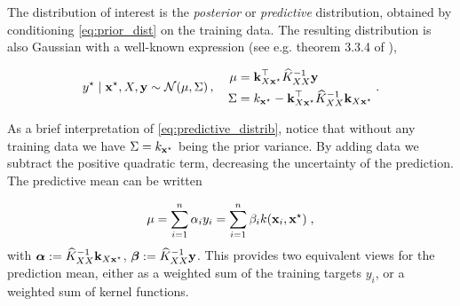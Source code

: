 \documentclass{article}
\begin{document}
The distribution of interest is the \emph{posterior} or \emph{predictive} distribution, obtained by conditioning \eqref{eq:prior_dist} on the training data. The resulting distribution is also Gaussian with a well-known expression (see e.g. theorem 3.3.4 of \cite{tong_multivariate_1990}),

\begin{equation} \label{eq:predictive_distrib}
    y^\star \mid \boldsymbol{\mathbf{x}}^\star, X, \boldsymbol{\mathbf{y}} \sim \mathcal N(\mu, \Sigma) \, , \quad 
    \begin{aligned}
        \mu &= \boldsymbol{\mathbf{k}}_{X \boldsymbol{\mathbf{x}}^\star}^\top \widehat K_{XX}^{-1} \boldsymbol{\mathbf{y}} \\
        \Sigma &= k_{\boldsymbol{\mathbf{x}}^\star} - \boldsymbol{\mathbf{k}}_{X \boldsymbol{\mathbf{x}}^\star}^\top \widehat K_{XX}^{-1} \boldsymbol{\mathbf{k}}_{X \boldsymbol{\mathbf{x}}^\star}
    \end{aligned} \; .
\end{equation}

As a brief interpretation of \eqref{eq:predictive_distrib}, notice that without any training data we have $\Sigma = k_{\boldsymbol{\mathbf{x}}^\star}$ being the prior variance. By adding data we subtract the positive quadratic term, decreasing the uncertainty of the prediction. %
The predictive mean can be written

\begin{equation*}
    \mu = \sum_{i=1}^n \alpha_i y_i = \sum_{i=1}^n \beta_i k(\boldsymbol{\mathbf{x}}_i, \boldsymbol{\mathbf{x}}^\star) \;,
\end{equation*}
%
with $\boldsymbol{\mathbf{\alpha}} := \widehat K_{XX}^{-1} \boldsymbol{\mathbf{k}}_{X\boldsymbol{\mathbf{x}}^\star}$, $\boldsymbol{\mathbf{\beta}} := \widehat K_{XX}^{-1} \boldsymbol{\mathbf{y}}$. This provides two equivalent views for the prediction mean, either as a weighted sum of the training targets $y_i$, or a weighted sum of kernel functions.


\end{document}
